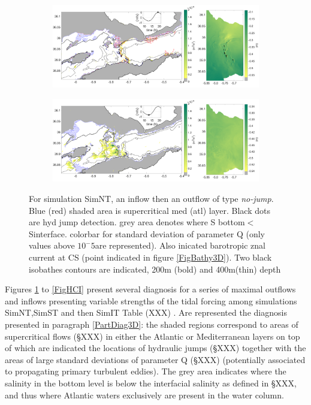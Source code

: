 \begin{figure}[!h]
 \centering
 
 \begin{subfigure}{\linewidth}
\centering
\includegraphics[width=1\linewidth]{./GBR3D/ME2_19h_p.png}
\end{subfigure}
 
 \begin{subfigure}{\linewidth}
\centering
\includegraphics[width=\linewidth]{./GBR3D/ME2_13h_p.png}
\end{subfigure}
\caption {For simulation SimNT, an inflow then an outflow of type \textit{no-jump}. Blue (red) shaded area is supercritical med (atl) layer. Black dots are hyd jump detection. grey area denotes where S bottom$<$Sinterface. colorbar for standard deviation of parameter Q (only values above $10^-5$are represented). Also inicated barotropic znal current at CS (point indicated in figure \ref{FigBathy3D}). Two black isobathes contours are indicated, 200m (bold) and 400m(thin) depth  }
\label{FigHCN}
\end{figure}

Figures \ref{FigHCN} to \ref{FigHCI} present several diagnosis for a series of maximal outflows and inflows \color{blue} presenting \color{black} variable strengths of the tidal forcing among simulations SimNT,SimST and then SimIT \color{blue}Table (XXX) \color{black}. Are represented the diagnosis presented in paragraph \ref{PartDiag3D}: \color{blue}the shaded regions correspond to areas of supercritical flows (\S XXX) in either the Atlantic or Mediterranean layers on top of which are indicated the locations of hydraulic jumps (\S XXX) together with the areas of large standard deviations of parameter Q (\S XXX) (potentially associated to propagating primary turbulent eddies). \color{black} The grey area indicates where the salinity in the bottom level is below the interfacial salinity as defined in \S XXX, and thus \color{blue} where Atlantic waters exclusively are present in the water column. \color{black}

